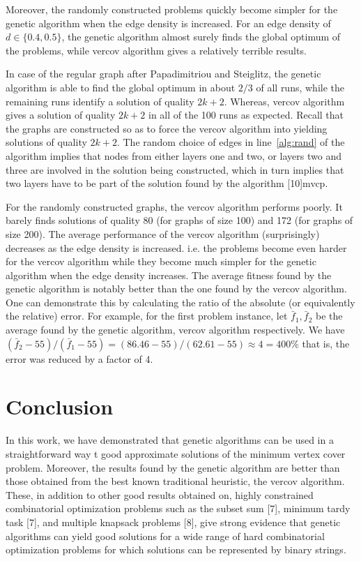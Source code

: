 \documentclass[12pt]{article}
\begin{document}
Moreover, the randomly constructed problems quickly
become simpler for the genetic algorithm when the edge
density is increased. For an edge density of $d \in \{0.4, 0.5\}$, the
genetic algorithm almost surely finds the global optimum
of the problems, while vercov algorithm gives a relatively terrible results.

In case of the regular graph after Papadimitriou and
Steiglitz, the genetic algorithm is able to find the global
optimum in about $2/3$ of all runs, while the remaining
runs identify a solution of quality $2k + 2$.
Whereas, vercov algorithm gives a solution of quality $2k + 2$ in all of the 100 runs as expected.
Recall that the graphs are constructed
so as to force the vercov algorithm into yielding solutions
of quality $2k + 2$.
The random choice of edges in line~\ref{alg:rand} of the algorithm implies that nodes from either layers one and two, or layers two and three are involved in the solution being constructed, which in turn implies that two layers have to be part of the solution found by the algorithm [10]mvcp.

For the randomly constructed graphs, the vercov algorithm performs
poorly.
It barely finds solutions of quality 80 (for graphs of size 100) and 172 (for graphs of size 200).
The average performance of the vercov algorithm (surprisingly)
decreases as the edge density is increased.
i.e. the problems become even harder for the vercov algorithm
while they become much simpler for the genetic algorithm when
the edge density increases.
The average fitness found by the genetic algorithm is notably
better than the one found by the vercov algorithm.
One can demonstrate this by calculating
the ratio of the absolute (or equivalently the relative) error.
For example, for the first problem instance,
let $\bar{f}_1, \bar{f}_2$ be the average found by
the genetic algorithm, vercov algorithm respectively.
We have $ (\bar{f}_2 - 55) / (\bar{f}_1 - 55) = (86.46 - 55)/(62.61 - 55) \approx 4 = 400\%$
that is, the error was reduced by a factor of 4.


\section{Conclusion}
In this work, we have demonstrated that genetic algorithms can be used in a straightforward way t
good approximate solutions of the minimum vertex cover
problem. Moreover, the results found by the genetic algorithm are better than those obtained from the best
known traditional heuristic, the vercov algorithm. These, in addition to other good results obtained on, highly constrained combinatorial optimization
problems such as the subset sum [7], minimum tardy
task [7], and multiple knapsack problems [8], give strong
evidence that genetic algorithms can yield good solutions for a wide range of hard combinatorial optimization problems for which solutions can be represented by
binary strings.


\pagebreak


\cleardoublepage{}
%
%
\printbibliography

\end{document}
